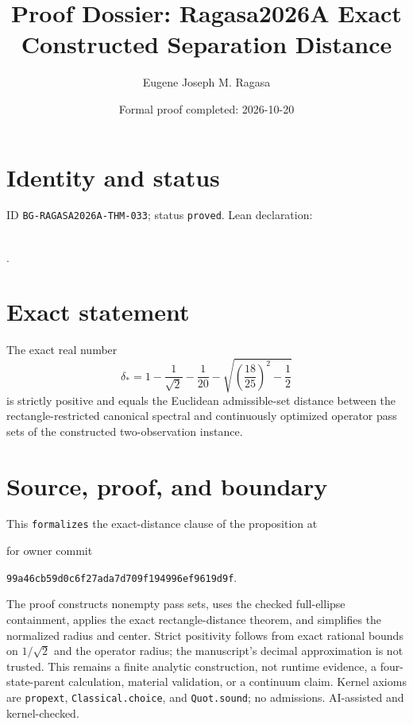 \documentclass[11pt]{article}
\title{Proof Dossier: Ragasa2026A Exact Constructed Separation Distance}\author{Eugene Joseph M. Ragasa}\date{Formal proof completed: 2026-10-20}
\begin{document}
\maketitle
\section{Identity and status}
ID \texttt{BG-RAGASA2026A-THM-033}; status \texttt{proved}. Lean declaration:
\par{}\\
{\tiny{}}.
\section{Exact statement}
The exact real number
\[
 \delta_*=1-\frac1{\sqrt2}-\frac1{20}
 -\sqrt{\left(\frac{18}{25}\right)^2-\frac12}
\]
is strictly positive and equals the Euclidean admissible-set distance between the
rectangle-restricted canonical spectral and continuously optimized operator pass sets of
the constructed two-observation instance.
\section{Source, proof, and boundary}
This \texttt{formalizes} the exact-distance clause of the proposition at
\begin{center}\small{}\end{center}
for owner commit
\begin{center}\small\texttt{99a46cb59d0c6f27ada7d709f194996ef9619d9f}.\end{center}
The proof constructs nonempty pass sets, uses the checked full-ellipse containment, applies
the exact rectangle-distance theorem, and simplifies the normalized radius and center.
Strict positivity follows from exact rational bounds on $1/\sqrt2$ and the operator radius;
the manuscript's decimal approximation is not trusted. This remains a finite analytic
construction, not runtime evidence, a four-state-parent calculation, material validation,
or a continuum claim. Kernel axioms are \texttt{propext}, \texttt{Classical.choice}, and
\texttt{Quot.sound}; no admissions. AI-assisted and kernel-checked.
\end{document}
